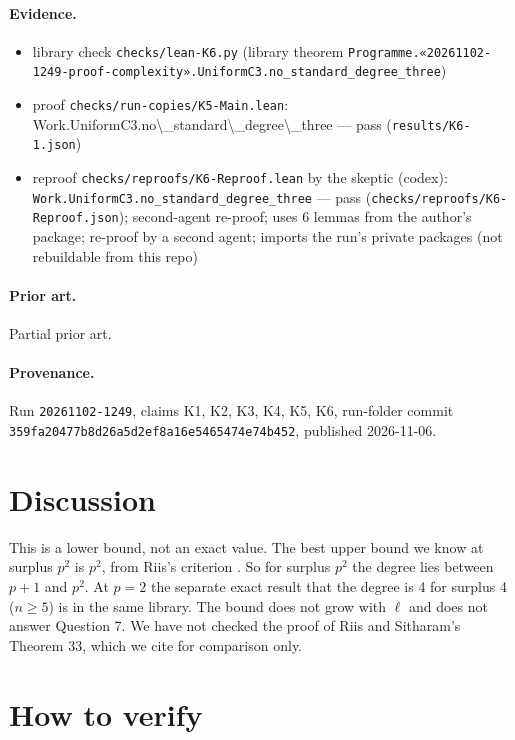 \documentclass{article}
\begin{document}
\paragraph{Evidence.}
\begin{itemize}
\item library check \texttt{checks/lean-K6.py} (library theorem \texttt{Programme.«20261102-1249-proof-complexity».UniformC3.no\_standard\_degree\_three})
\item proof \texttt{checks/run-copies/K5-Main.lean}: Work.UniformC3.no\textbackslash{}\_standard\textbackslash{}\_degree\textbackslash{}\_three --- pass (\texttt{results/K6-1.json})
\item reproof \texttt{checks/reproofs/K6-Reproof.lean} by the skeptic (codex): \texttt{Work.UniformC3.no\_standard\_degree\_three} --- pass (\texttt{checks/reproofs/K6-Reproof.json}); second-agent re-proof; uses 6 lemmas from the author's package; re-proof by a second agent; imports the run's private packages (not rebuildable from this repo)
\end{itemize}

\paragraph{Prior art.} Partial prior art.


\paragraph{Provenance.}
Run \texttt{20261102-1249}, claims K1, K2, K3, K4, K5, K6, run-folder commit \texttt{359fa20477b8d26a5d2ef8a16e5465474e74b452}, published 2026-11-06.

\section{Discussion}

This is a lower bound, not an exact value. The best upper bound we know at surplus $p^2$ is $p^2$,
from Riis's criterion \cite{riis1993independence,razborov2001php}. So for surplus $p^2$ the degree
lies between $p+1$ and $p^2$. At $p=2$ the separate exact result that the degree is 4 for surplus 4
($n\ge5$) is in the same library. The bound does not grow with $\ell$ and does not answer
Question 7. We have not checked the proof of Riis and Sitharam's Theorem 33, which we cite for
comparison only.

\section{How to verify}
\end{document}
